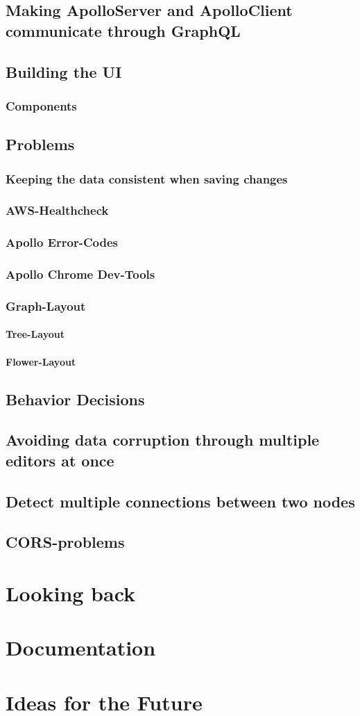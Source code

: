 \section{Making ApolloServer and ApolloClient communicate through GraphQL}
\section{Building the UI}
\subsection{Components}
\section{Problems}
\subsection{Keeping the data consistent when saving changes}
\subsection{AWS-Healthcheck}
\subsection{Apollo Error-Codes}
\subsection{Apollo Chrome Dev-Tools}
\subsection{Graph-Layout}
\subsubsection{Tree-Layout}
\subsubsection{Flower-Layout}
\section{Behavior Decisions}
\section{Avoiding data corruption through multiple editors at once}
\section{Detect multiple connections between two nodes}
\section{CORS-problems}

\chapter{Looking back}

\chapter{Documentation}

\chapter{Ideas for the Future}